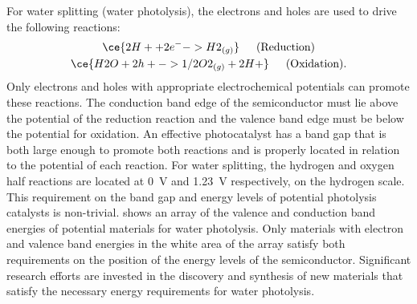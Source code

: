 For water splitting (water photolysis),\cite{memming2001semiconductor} the electrons and
holes are used to drive the following reactions:
\begin{gather}
	\ce{2H+ + 2e^{-} -> H2_{(g)}} \hspace{1.5em} \text{(Reduction)}\\
	\ce{H2O + 2h+ -> 1/2O2_{(g)} + 2H+} \hspace{1.5em} \text{(Oxidation).}
\end{gather}
Only electrons and holes with appropriate electrochemical potentials can promote these
reactions. The conduction band edge of the semiconductor must lie above the potential of
the reduction reaction and the valence band edge must be below the potential for
oxidation. An effective photocatalyst has a band gap that is both large enough to promote
both reactions and is properly located in relation to the potential of each reaction. For
water splitting, the hydrogen and oxygen half reactions are located at 0~V and 1.23~V
respectively,\cite{noauthororeditor2007handbook} on the hydrogen scale. This requirement
on the band gap and energy levels of potential photolysis catalysts is non-trivial.
 shows an array of the valence and conduction band energies of
potential materials for water photolysis.\cite{Morrison:1980va} Only materials with
electron and valence band energies in the white area of the array satisfy both
requirements on the position of the energy levels of the semiconductor. Significant
research efforts\cite{Osterloh:2008fp} are invested in the discovery and synthesis of new
materials that satisfy the necessary energy requirements for water photolysis. 

